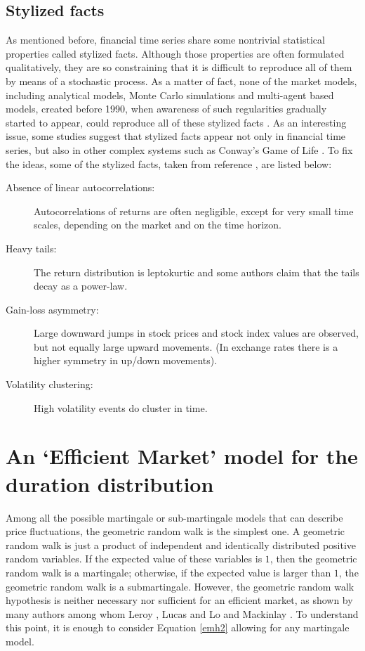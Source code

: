 \documentclass[a4paper]{jpconf}
\begin{document}
\subsection{Stylized facts}
\label{stylized}
As mentioned before, financial time series share some nontrivial statistical properties called stylized facts. Although those properties are often formulated qualitatively, they are so constraining that it is difficult to reproduce all of them by means of a stochastic process\cite{Rama}. As a matter of fact, none of the market models, including analytical models, Monte Carlo simulations and multi-agent based models, created before 1990, when awareness of such regularities gradually started to appear, could reproduce all of these stylized facts \cite{Lux}. As an interesting issue, some studies suggest that stylized facts appear not only in financial time series, but also in other complex systems such as Conway's Game of Life \cite{Hernandez}. To fix the ideas, some of the stylized facts, taken from reference \cite{Rama}, are listed below:

\begin{description}
\item[Absence of linear autocorrelations:] Autocorrelations of returns are often negligible, except for very small time scales, depending on the market and on the time horizon.
\item[Heavy tails:] The return distribution is leptokurtic and some authors claim that the tails decay as a power-law.
\item[Gain-loss asymmetry:] Large downward jumps in stock prices and stock index values are observed, but not equally large upward movements. (In exchange rates there is a higher symmetry in up/down movements).
\item[Volatility clustering:] High volatility events do cluster in time.
\end{description}

\section{An `Efficient Market' model for the duration distribution}
\label{model}
Among all the possible martingale or sub-martingale models that can describe price fluctuations, the geometric random walk is the simplest one. A geometric random walk is just a product of independent and identically distributed positive random variables. If the expected value of these variables is $1$, then the geometric random walk is a martingale; otherwise, if the expected value is larger than $1$, the geometric random walk is a submartingale. However, the geometric random walk hypothesis is neither necessary nor sufficient for an efficient market, as shown by many authors among whom Leroy \cite{leroy}, Lucas \cite{lucas} and Lo and Mackinlay \cite{lo}. To understand this point, it is enough to consider Equation \eqref{emh2} allowing for any martingale model.
\end{document}
